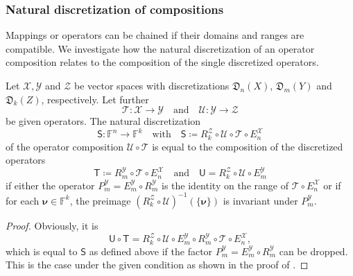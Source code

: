 \documentclass[a4paper]{paper}
\newcommand*{\SPC}[1]{{\ensuremath{\mathscr{#1}}}}
\newcommand*{\SPCX}{\SPC{X}}
\newcommand*{\SPCY}{\SPC{Y}}
\newcommand*{\SPCZ}{\SPC{Z}}
\newcommand*{\FIELD}{{\ensuremath{\mathbb{F}}}}
\newcommand*{\Fn}{{\ensuremath{\FIELD^n}}}
\newcommand*{\Fk}{{\ensuremath{\FIELD^k}}}
\newcommand*{\OP}[1]{{\ensuremath{\mathcal{#1}}}}
\newcommand*{\OPT}{\OP{T}}
\newcommand*{\OPU}{\OP{U}}
\newcommand{\DISCOP}[1]{{\ensuremath{\mathsf{#1}}}}
\newcommand*{\DISCOPT}{\DISCOP{T}}
\newcommand*{\DISCOPU}{\DISCOP{U}}
\newcommand*{\EXT}[2]{\ensuremath{E_{#1}^{#2}}}
\newcommand*{\REST}[2]{\ensuremath{R_{#1}^{#2}}}
\newcommand*{\PROJ}[2]{\ensuremath{P_{#1}^{#2}}}
\newcommand*{\RmY}{{\ensuremath{\REST{m}{\SPC{Y}}}}}
\newcommand*{\EnX}{{\ensuremath{\EXT{n}{\SPC{X}}}}}
\newcommand*{\EmY}{{\ensuremath{\EXT{m}{\SPC{Y}}}}}
\newcommand*{\PmY}{{\ensuremath{\PROJ{m}{\SPCY}}}}
\newcommand*{\DISCR}[2]{{\ensuremath{\mathfrak{D}_{#1}(#2)}}}
\newcommand*{\DISCRnX}{\DISCR{n}{X}}
\newcommand*{\DISCRmY}{\DISCR{m}{Y}}
\newcommand*{\DISCRkZ}{\DISCR{k}{Z}}
\DeclareMathOperator{\DEFEQ}{{\coloneqq}}
\newcommand*{\BDnu}{\boldsymbol{\nu}}
\begin{document}
\subsubsection{Natural discretization of compositions}
\label{subsubsec:discr:operator:op_comp}

Mappings or operators can be chained if their domains and ranges are compatible. We investigate how the natural 
discretization of an operator composition relates to the composition of the single discretized operators.


\begin{lemma}
 \label{lemma:discr:operator:op_comp:natural_is_comp}
 Let $\SPCX, \SPCY$ and $\SPCZ$ be vector spaces with discretizations $\DISCRnX$, 
 $\DISCRmY$ and $\DISCRkZ$, respectively. Let further
 \begin{equation*}
  \OPT \colon \SPCX \to \SPCY \quad \text{and} \quad \OPU \colon \SPCY \to \SPCZ
 \end{equation*}
 be given operators. The natural discretization
 \begin{equation*}
  \DISCOP{S}\colon \Fn \to \Fk 
  \quad \text{with} \quad
  \DISCOP{S} \DEFEQ  \REST{k}{\SPCZ} \circ \OPU \circ \OPT \circ \EnX
 \end{equation*}
 of the operator composition $\OPU \circ \OPT$ is equal to the composition of the discretized operators
 \begin{equation*}
  \DISCOPT \DEFEQ  \RmY \circ \OPT \circ \EnX
  \quad \text{and} \quad
  \DISCOPU = \REST{k}{\SPCZ} \circ \OPU \circ \EmY
 \end{equation*}
 if either the operator $\PmY = \EmY \circ \RmY$ is the identity on the range of $\OPT \circ \EnX$ or if for each 
 $\BDnu \in \Fk$, the preimage $(\REST{k}{\SPCZ} \circ \OPU)^{-1}(\{\BDnu\})$ is invariant under 
 $\PmY$.
\end{lemma}
\vspace{1em}


\begin{proof}
 Obviously, it is
 \begin{equation*}
  \DISCOPU \circ \DISCOPT = \REST{k}{\SPCZ} \circ \OPU \circ \EmY \circ \RmY \circ \OPT \circ \EnX,
 \end{equation*}
 which is equal to $\DISCOP{S}$ as defined above if the factor $\PmY = \EmY \circ \RmY$ can be dropped. This is the 
 case under the given condition as shown in the proof of .
\end{proof}
\end{document}
